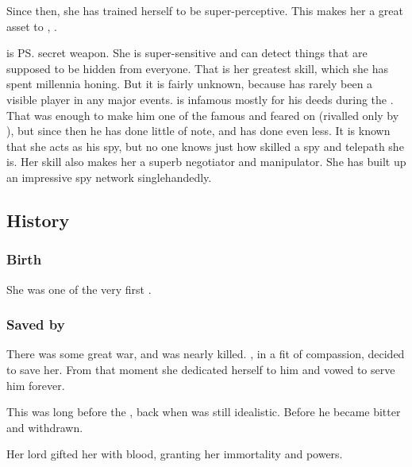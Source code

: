 Since then, she has trained herself to be super-perceptive. 
This makes her a great asset to \Ishnaruchaefir, . 

\Criseis is \ps{\Ishnaruchaefir} secret weapon. 
She is super-sensitive and can detect things that are supposed to be hidden from everyone.
That is her greatest skill, which she has spent millennia honing.
But it is fairly unknown, because \Criseis has rarely been a visible player in any major events.
\Ishnaruchaefir is infamous mostly for his deeds during the \secondbanewar.
That was enough to make him one of the famous and feared \dragons on \Miith (rivalled only by \Secherdamon), but since then he has done little of note, and \Criseis has done even less.
It is known that she acts as his spy, but no one knows just how skilled a spy and telepath she is.
Her skill also makes her a superb negotiator and manipulator.
She has built up an impressive spy network singlehandedly.









\subsection{History}





\subsubsection{Birth}
She was one of the very first \scathae{}. 





\subsubsection{Saved by \Ishnaruchaefir}
There was some great war, and \Criseis{} was nearly killed. 
\Ishnaruchaefir, in a fit of compassion, decided to save her. 
From that moment she dedicated herself to him and vowed to serve him forever. 

This was long before the \secondbanewar, back when \Ishnaruchaefir{} was still idealistic. 
Before he became bitter and withdrawn. 

Her lord gifted her with \xzaishannic{} blood, granting her immortality and \daemonic{} powers. 

